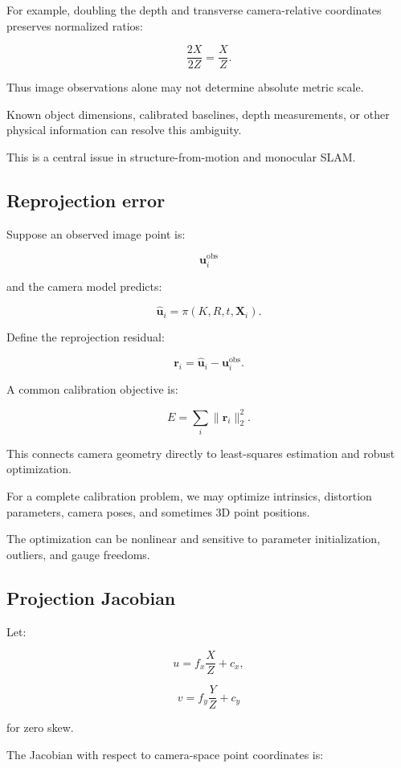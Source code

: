 For example, doubling the depth and transverse camera-relative coordinates preserves normalized ratios:

\[
 \frac{2X}{2Z}=\frac XZ.
\]

Thus image observations alone may not determine absolute metric scale.

Known object dimensions, calibrated baselines, depth measurements, or other physical information can resolve this ambiguity.

This is a central issue in structure-from-motion and monocular SLAM.

\subsection{Reprojection error}\label{02-foundations-ii-ch035-reprojection-error}

Suppose an observed image point is:

\[
 \mathbf u_i^{\mathrm{obs}}
\]

and the camera model predicts:

\[
 \hat{\mathbf u}_i= \pi(K,R,t,\mathbf X_i).
\]

Define the reprojection residual:

\[
 \boxed{ \mathbf r_i= \hat{\mathbf u}_i-\mathbf u_i^{\mathrm{obs}} }.
\]

A common calibration objective is:

\[
 \boxed{ E= \sum_i \|\mathbf r_i\|_2^2 }.
\]

This connects camera geometry directly to least-squares estimation and robust optimization.

For a complete calibration problem, we may optimize intrinsics, distortion parameters, camera poses, and sometimes 3D point positions.

The optimization can be nonlinear and sensitive to parameter initialization, outliers, and gauge freedoms.

\subsection{Projection Jacobian}\label{02-foundations-ii-ch035-projection-jacobian}

Let:

\[
 u=f_x\frac XZ+c_x,
\]

\[
 v=f_y\frac YZ+c_y
\]

for zero skew.

The Jacobian with respect to camera-space point coordinates is:


